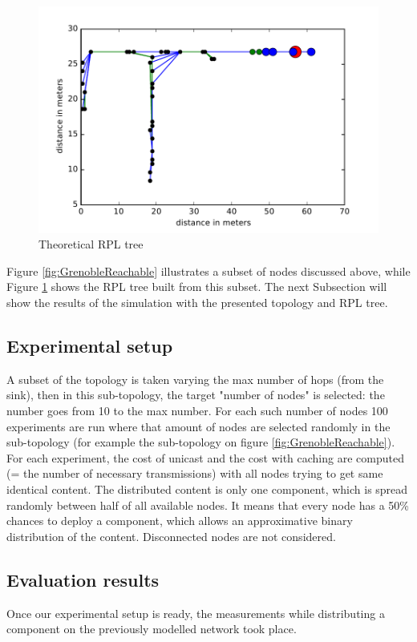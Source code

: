 \begin{figure}[]
	\centering
	\includegraphics[width=0.8 \columnwidth]{chapters/inter-node.images/grenoble-RPL.pdf}
	\caption{Theoretical RPL tree} \label{fig:GrenobleRPL}
\end{figure}

Figure \ref{fig:GrenobleReachable} illustrates a subset of nodes discussed above, while Figure \ref{fig:GrenobleRPL} shows the RPL tree built from this subset.
The next Subsection will show the results of the simulation with the presented topology and RPL tree.

\subsection{Experimental setup}
A subset of the topology is taken varying the max number of hops (from the sink), then in this sub-topology, the target "number of nodes" is selected: the number goes from 10 to the max number.
For each such number of nodes 100 experiments are run where that amount of nodes are selected randomly in the sub-topology (for example the sub-topology on figure \ref{fig:GrenobleReachable}).
For each experiment, the cost of unicast and the cost with caching are computed (= the number of necessary transmissions) with all nodes trying to get same identical content.
The distributed content is only one component, which is spread randomly between half of all available nodes.
It means that every node has a 50\% chances to deploy a component, which allows an approximative binary distribution of the content.
Disconnected nodes are not considered.

\subsection{Evaluation results}
Once our experimental setup is ready, the measurements while distributing a component on the previously modelled network took place.

